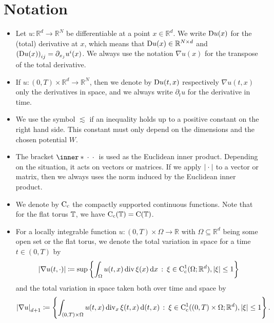 \chapter{Notation}


	\begin{itemize}[leftmargin=*]
		\item	
		Let $ u \colon \mathbb{ R }^{ d } \to \mathbb{ R }^{ N } $ be 
		differentiable at a point $ x \in \mathbb{ R }^{d } $. We write $ \mathrm{D} 
		u ( x ) $ for the (total) derivative at $ x $, which means that
		$ \mathrm{D} u ( x ) \in \mathbb{ R }^{ N \times d } $ and
		$ \left( \mathrm{D} u ( x ) \right)_{ i j } = \partial_{ x_{ j } } u^{ i } ( 
		x ) $. We always use the notation $ \nabla u ( x ) $ for the transpose 
		of the total derivative. 
		
		\item
		If $ u \colon ( 0 , T ) \times \mathbb{ R }^{ d } \to \mathbb{ R 
		}^{ N } $, then we denote by $ \mathrm{D} u (t, x ) $  respectively $ \nabla 
		u ( 
		t,  x ) $ only the derivatives in space, and we always write $ 
		\partial_{ 
		t } u $ for the derivative in time.
	
		\item
		We use the symbol $ \lesssim $ if an inequality holds up to a positive 
		constant on the right hand side. This constant must only depend on the 
		dimensions and the chosen potential $ W $.
		
		\item 
		The bracket $ \inner*{\:\cdot\:}{\:\cdot\:} $ is used as the Euclidean 
		inner 
		product. Depending on the situation, it acts on vectors or matrices.
		If we apply $ \abs{ \:\cdot\: } $ to a vector or matrix, then we always 
		uses the norm induced by the Euclidean inner product.
		
		\item 
		We denote by $ \operatorname{C}_{ \mathrm{c} } $ the compactly supported 
		continuous functions. Note that for the flat torus $ \operatorname{\mathbb{T}} $, we 
		have $ \operatorname{C}_{ \mathrm{c} } ( \operatorname{\mathbb{T}} ) = \operatorname{C} ( \operatorname{\mathbb{T}} ) $.
		
		\item
		For a locally integrable function $ u \colon ( 0 , T ) \times \Omega 
		\to \mathbb{ R } $ 
		with $ \Omega \subseteq \mathbb{ R }^{ d } $ being some open set or the 
		flat torus, we denote the total variation in space for a time $ t \in ( 
		0 , T ) $ by
		\begin{equation*}
			\abs{ \nabla u ( t , \cdot ) }
			\coloneqq
			\sup 
			\left\{
				\int_{ \Omega }
					u ( t , x ) \operatorname{div} \xi ( x ) 
				\dd{ x }
				\, \colon \,
				\xi \in \operatorname{C}_{ \mathrm{c} }^{ 1 } ( \Omega ; \mathbb{ R }^{ d 
				} ) , \abs{ \xi } \leq 1
			\right\}
		\end{equation*}	
		and the total variation in space taken both over time and space by
		\begin{equation*}
			\abs{ \nabla u }_{ d + 1 }
			\coloneqq
			\left\{
			\int_{ ( 0 , T ) \times \Omega }
			u ( t , x ) \operatorname{div}_{ x } \xi ( t , x ) 
			\dd{ ( t, x ) }
			\, \colon \,
			\xi \in \operatorname{C}_{ \mathrm{c} }^{ 1 } (( 0 , T ) \times \Omega ; 
			\mathbb{ R }^{ d 
			} ) , \abs{ \xi } \leq 1
			\right\}.
		\end{equation*}
	

\end{itemize}
